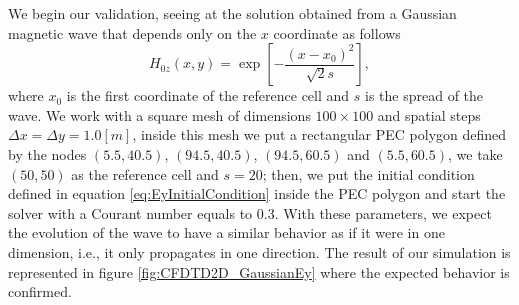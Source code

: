 \documentclass[12pt, oneside]{book}
\begin{document}
We begin our validation, seeing at the solution obtained from a Gaussian magnetic wave that depends only on the $x$ coordinate as follows
\begin{equation}
    H_{0z}(x,y) = \exp \left[ - \dfrac{(x - x_0)^2}{\sqrt{2} s} \right],
\label{eq:EyInitialCondition}
\end{equation}
where $x_0$ is the first coordinate of the reference cell and $s$ is the spread of the wave. We work with a square mesh of dimensions $100 \times 100$ and spatial steps $\Delta x = \Delta y = 1.0 [m]$, inside this mesh we put a rectangular PEC polygon defined by the nodes $(5.5,40.5)$, $(94.5,40.5)$, $(94.5, 60.5)$ and $(5.5, 60.5)$, we take $(50, 50)$ as the reference cell and $s=20$; then, we put the initial condition defined in equation \ref{eq:EyInitialCondition} inside the PEC polygon and start the solver with a Courant number equals to $0.3$. With these parameters, we expect the evolution of the wave to have a similar behavior as if it were in one dimension, i.e., it only propagates in one direction. The result of our simulation is represented in figure \ref{fig:CFDTD2D_GaussianEy} where the expected behavior is confirmed.
\end{document}
